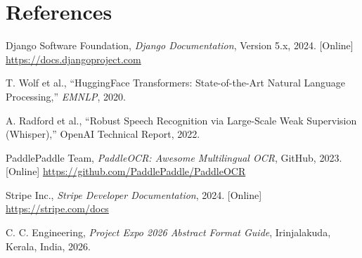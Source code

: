 \documentclass[10pt,twocolumn]{article}
\begin{document}
\section*{References}

\begin{enumerate}[leftmargin=1.2em, topsep=2pt, itemsep=1pt,
                  label={[\arabic*]}, font=\small]
  \small
  \item Django Software Foundation, \textit{Django Documentation}, Version 5.x,
        2024. [Online] \url{https://docs.djangoproject.com}
  \item T. Wolf et al., ``HuggingFace Transformers: State-of-the-Art Natural
        Language Processing,'' \textit{EMNLP}, 2020.
  \item A. Radford et al., ``Robust Speech Recognition via Large-Scale Weak
        Supervision (Whisper),'' OpenAI Technical Report, 2022.
  \item PaddlePaddle Team, \textit{PaddleOCR: Awesome Multilingual OCR},
        GitHub, 2023. [Online] \url{https://github.com/PaddlePaddle/PaddleOCR}
  \item Stripe Inc., \textit{Stripe Developer Documentation}, 2024.
        [Online] \url{https://stripe.com/docs}
  \item C. C. Engineering, \textit{Project Expo 2026 Abstract Format Guide},
        Irinjalakuda, Kerala, India, 2026.
\end{enumerate}
\end{document}

